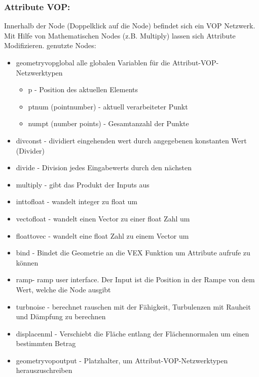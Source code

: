 \documentclass[paper=a4,fontsize=12pt,ngerman]{scrartcl}
\begin{document}
 	\subsubsection*{Attribute VOP:}
 	Innerhalb der Node (Doppelklick auf die Node) befindet sich ein VOP Netzwerk. Mit Hilfe von Mathematischen Nodes (z.B. Multiply) lassen sich Attribute Modifizieren.
 	genutzte Nodes:
 	\begin{itemize}
 		\item geometryvopglobal 	alle globalen Variablen für die Attribut-VOP-Netzwerktypen
 		\begin{itemize}
 			\item p - Position des aktuellen Elements
 			\item ptnum (pointnumber) - aktuell verarbeiteter Punkt 
 			\item numpt (number points) - Gesamtanzahl der Punkte
 		\end{itemize}
 		\item divconst - dividiert eingehenden wert durch angegebenen konstanten Wert (Divider)
 		\item divide - Division jedes Eingabewerts durch den nächsten 
 		\item multiply	 - gibt das Produkt der Inputs aus
 		\item inttofloat - wandelt integer zu float um
 		\item vectofloat - wandelt einen Vector zu einer float Zahl um
 		\item floattovec - wandelt eine float Zahl zu einem Vector um
 		\item bind - Bindet die Geometrie an die VEX Funktion um Attribute aufrufe zu können
 		\item ramp- ramp user interface. Der Input ist die Position in der Rampe von dem Wert, welche die Node ausgibt
 		\item turbnoise - berechnet rauschen mit der Fähigkeit, Turbulenzen mit Rauheit und Dämpfung zu berechnen
 		\item displacenml - Verschiebt die Fläche entlang der Flächennormalen um einen bestimmten Betrag
 		\item geometryvopoutput - Platzhalter, um Attribut-VOP-Netzwerktypen herauszuschreiben
 	\end{itemize}
 	
\end{document}
